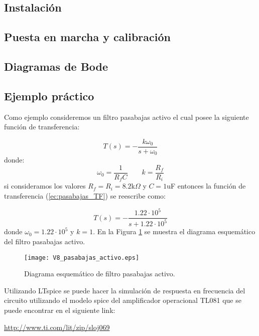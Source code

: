		\subsection{Instalación}
		
		\subsection{Puesta en marcha y calibración}
	
		\subsection{Diagramas de Bode}\label{sec:diagrama_de_bode}
	
		\subsection{Ejemplo práctico}
	Como ejemplo consideremos un filtro pasabajas activo el cual posee la siguiente función de transferencia:
	
	\begin{equation}
		T(s) = - \frac{k \omega_{0}}{s + \omega_{0}}
		\label{ec:pasabajas_TF}
	\end{equation}
	donde:
	\begin{equation}
		\omega_{0} = \frac{1}{R_{f} C} \qquad k = \frac{R_{f}}{R_{i}}
	\end{equation}
	si consideramos los valores $R_{f} = R_{i}= 8.2$k$\Omega$ y $C = 1$uF entonces la función de transferencia (\ref{ec:pasabajas_TF}) se reescribe como:
	
	\begin{equation}
		T(s) = - \frac{1.22 \cdot 10^{5}}{s + 1.22 \cdot 10^{5}}
	\end{equation}
	donde $\omega_{0} = 1.22 \cdot 10^{5} $ y $k = 1$. En la Figura \ref{fig:V8_pasabajas_activo} se muestra el diagrama esquemático del filtro pasabajas activo.
	
	\begin{figure}[hbtp]
		\caption{Diagrama esquemático de filtro pasabajas activo.}
		\label{fig:V8_pasabajas_activo}
		\centering
		\texttt{[image: V8\_pasabajas\_activo.eps]}
	\end{figure}
	
	Utilizando LTspice se puede hacer la simulación de respuesta en frecuencia del circuito utilizando el modelo spice del amplificador operacional TL081 que se puede encontrar en el siguiente link:
	
	\begin{center}
		\url{http://www.ti.com/lit/zip/sloj069}
	\end{center}
	
